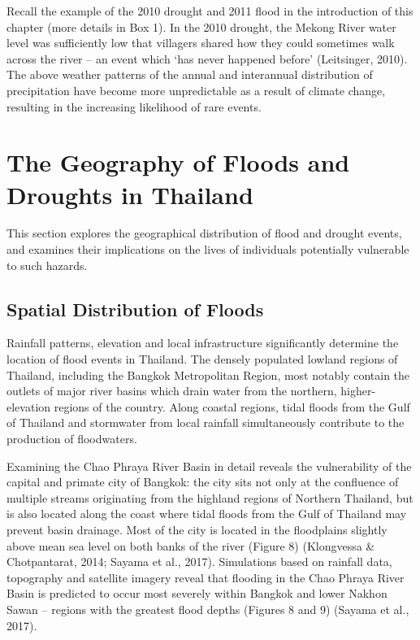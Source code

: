 Recall the example of the 2010 drought and 2011 flood in the introduction of this chapter (more details in Box 1). In the 2010 drought, the Mekong River water level was sufficiently low that villagers shared how they could sometimes walk across the river -- an event which ‘has never happened before’ (Leitsinger, 2010). The above weather patterns of the annual and interannual distribution of precipitation have become more unpredictable as a result of climate change, resulting in the increasing likelihood of rare events.


\section{The Geography of Floods and Droughts in Thailand}

This section explores the geographical distribution of flood and drought events, and examines their implications on the lives of individuals potentially vulnerable to such hazards.

\subsection{Spatial Distribution of Floods}

Rainfall patterns, elevation and local infrastructure significantly determine the location of flood events in Thailand. The densely populated lowland regions of Thailand, including the Bangkok Metropolitan Region, most notably contain the outlets of major river basins which drain water from the northern, higher-elevation regions of the country. Along coastal regions, tidal floods from the Gulf of Thailand and stormwater from local rainfall simultaneously contribute to the production of floodwaters.

Examining the Chao Phraya River Basin in detail reveals the vulnerability of the capital and primate city of Bangkok: the city sits not only at the confluence of multiple streams originating from the highland regions of Northern Thailand, but is also located along the coast where tidal floods from the Gulf of Thailand may prevent basin drainage. Most of the city is located in the floodplains slightly above mean sea level on both banks of the river (Figure 8) (Klongvessa \& Chotpantarat, 2014; Sayama et al., 2017). Simulations based on rainfall data, topography and satellite imagery reveal that flooding in the Chao Phraya River Basin is predicted to occur most severely within Bangkok and lower Nakhon Sawan -- regions with the greatest flood depths (Figures 8 and 9) (Sayama et al., 2017).

